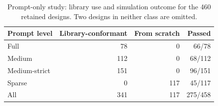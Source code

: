 \begin{table}[ht]
\centering
\caption{Prompt-only study: library use and simulation outcome for the 460 retained designs. Two designs in neither class are omitted.}
\label{tab:conformance}
\begin{tabular}{@{}lrrr@{}}
\toprule
Prompt level & Library-conformant & From scratch & Passed \\
\midrule
Full & 78 & 0 & 66/78 \\
Medium & 112 & 0 & 68/112 \\
Medium-strict & 151 & 0 & 96/151 \\
Sparse & 0 & 117 & 45/117 \\
\midrule
All & 341 & 117 & 275/458 \\
\bottomrule
\end{tabular}
\end{table}

